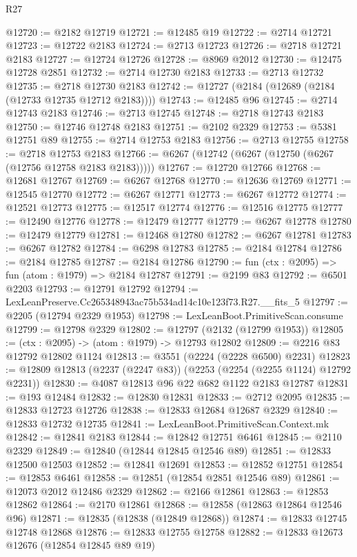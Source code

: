 \begin{lexlean}{R27}
\begin{coremodule}
@12720 := @2182 @12719
@12721 := @12485 @19
@12722 := @2714 @12721
@12723 := @12722 @2183
@12724 := @2713 @12723
@12726 := @2718 @12721 @2183
@12727 := @12724 @12726
@12728 := @8969 @2012
@12730 := @12475 @12728 @2851
@12732 := @2714 @12730 @2183
@12733 := @2713 @12732
@12735 := @2718 @12730 @2183
@12742 := @12727 (@2184 (@12689 (@2184 (@12733 @12735 @12712 @2183))))
@12743 := @12485 @96
@12745 := @2714 @12743 @2183
@12746 := @2713 @12745
@12748 := @2718 @12743 @2183
@12750 := @12746 @12748 @2183
@12751 := @2102 @2329
@12753 := @5381 @12751 @89
@12755 := @2714 @12753 @2183
@12756 := @2713 @12755
@12758 := @2718 @12753 @2183
@12766 := @6267 (@12742 (@6267 (@12750 (@6267 (@12756 @12758 @2183 @2183)))))
@12767 := @12720 @12766
@12768 := @12681 @12767
@12769 := @6267 @12768
@12770 := @12636 @12769
@12771 := @12545 @12770
@12772 := @6267 @12771
@12773 := @6267 @12772
@12774 := @12521 @12773
@12775 := @12517 @12774
@12776 := @12516 @12775
@12777 := @12490 @12776
@12778 := @12479 @12777
@12779 := @6267 @12778
@12780 := @12479 @12779
@12781 := @12468 @12780
@12782 := @6267 @12781
@12783 := @6267 @12782
@12784 := @6298 @12783
@12785 := @2184 @12784
@12786 := @2184 @12785
@12787 := @2184 @12786
@12790 := fun (ctx : @2095) => fun (atom : @1979) => @2184 @12787
@12791 := @2199 @83
@12792 := @6501 @2203
@12793 := @12791 @12792
@12794 := LexLeanPreserve.Cc265348943ac75b534ad14c10e123f73.R27.__fits_5
@12797 := @2205 (@12794 @2329 @1953)
@12798 := LexLeanBoot.PrimitiveScan.consume
@12799 := @12798 @2329
@12802 := @12797 (@2132 (@12799 @1953))
@12805 := (ctx : @2095) -> (atom : @1979) -> @12793 @12802
@12809 := @2216 @83 @12792 @12802 @1124
@12813 := @3551 (@2224 (@2228 @6500) @2231)
@12823 := @12809 @12813 (@2237 (@2247 @83)) (@2253 (@2254 (@2255 @1124) @12792 @2231))
@12830 := @4087 @12813 @96 @22 @682 @1122 @2183 @12787
@12831 := @193 @12484
@12832 := @12830 @12831
@12833 := @2712 @2095
@12835 := @12833 @12723 @12726
@12838 := @12833 @12684 @12687 @2329
@12840 := @12833 @12732 @12735
@12841 := LexLeanBoot.PrimitiveScan.Context.mk
@12842 := @12841 @2183
@12844 := @12842 @12751 @6461
@12845 := @2110 @2329
@12849 := @12840 (@12844 @12845 @12546 @89)
@12851 := @12833 @12500 @12503
@12852 := @12841 @12691
@12853 := @12852 @12751
@12854 := @12853 @6461
@12858 := @12851 (@12854 @2851 @12546 @89)
@12861 := @12073 @2012 @12486 @2329
@12862 := @2166 @12861
@12863 := @12853 @12862
@12864 := @2170 @12861
@12868 := @12858 (@12863 @12864 @12546 @96)
@12871 := @12835 (@12838 (@12849 @12868))
@12874 := @12833 @12745 @12748 @12868
@12876 := @12833 @12755 @12758
@12882 := @12833 @12673 @12676 (@12854 @12845 @89 @19)

\end{coremodule}
\end{lexlean}
